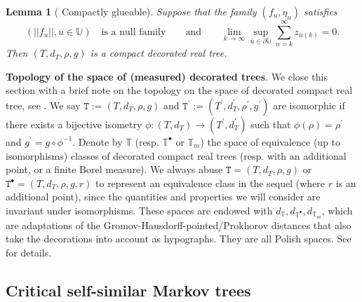 \documentclass[12pt]{article}
\numberwithin{equation}{section}
\theoremstyle{plain}
\newtheorem{lem}[thm]{Lemma}
\theoremstyle{definition}
\begin{document}
\begin{lem}[{\cite[Lemma 1.5]{BertoinJean2024SMta}} Compactly glueable]\label{thm: gluing building blocks}
Suppose that the family $(f_u, \eta_u)$ satisfies
\begin{equation}\label{eq: condition 1}
(||f_u||, u\in\mathbb{U}) \quad \mbox{is a null family}
 \qquad \mbox{and}  \qquad
\lim_{k\to\infty} \sup_{\bar{u}\in\partial\mathbb{U}} \sum^{\infty}_{n=k} z_{\bar{u}(k)} = 0.
\end{equation}
Then $(T, d_T, \rho, g)$ is a compact decorated real tree.
\end{lem}

\noindent \textbf{Topology of the space of (measured) decorated trees}.
\label{sec: topology} We close this section with a brief note on the topology on the space of decorated compact real tree, see \cite[Section 1.4]{BertoinJean2024SMta}. We say $\mathtt{T}:=(T,d_T,\rho,g) $ and $\mathtt{T}^\prime:=(T^\prime,d_T^\prime,\rho^\prime,g^\prime)$ are isomorphic if there exists a bijective isometry $\phi: (T,d_T)\to (T^\prime,d_T^\prime)$ such that $\phi(\rho)=\rho^\prime$ and  $g^\prime=g\circ \phi^{-1}$. Denote by $\mathbb T$ (resp. $\mathbb{T}^\bullet$ or $\mathbb{T}_m$) the space of equivalence (up to isomorphisms) classes of  decorated compact real trees (resp. with an additional point, or a finite Borel measure).  We always abuse $\mathtt{T}=(T,d_T,\rho,g)$ or $\mathtt{T}^\bullet=(T,d_T,\rho,g,r)$ to represent an equivalence class in the sequel (where $r$ is an additional point), since the quantities and properties we will consider are invariant under isomorphisms.  These spaces are endowed with $ d_{\mathbb{T}}, d_{\mathbb{T}^\bullet}, d_{\mathbb{T}_m}$, which are adaptations of the Gromov-Hausdorff-pointed/Prokhorov distances that also take the decorations into account as hypographs. They are all Polish spaces. See \cite[Section 1.4]{BertoinJean2024SMta} for details.


\subsection{Critical self-similar Markov trees}
\end{document}

